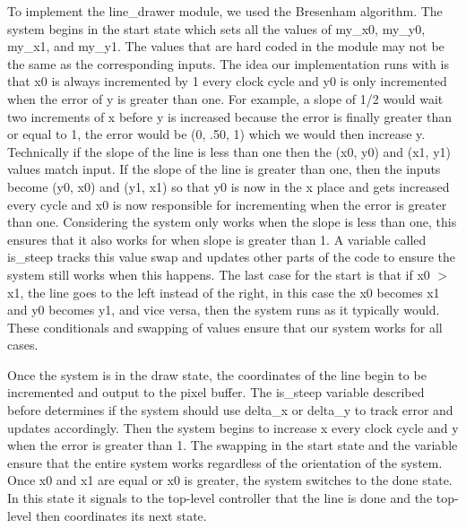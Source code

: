 \documentclass[11pt, titlepage]{article}
\begin{document}
            To implement the line\_drawer module, we used the Bresenham algorithm. The system begins in the start state which sets all the values of my\_x0, my\_y0, my\_x1, and my\_y1. The values that are hard coded in the module may not be the same as the corresponding inputs. The idea our implementation runs with is that x0 is always incremented by 1 every clock cycle and y0 is only incremented when the error of y is greater than one. For example, a slope of 1/2 would wait two increments of x before y is increased because the error is finally greater than or equal to 1, the error would be (0, .50, 1) which we would then increase y. Technically if the slope of the line is less than one then the (x0, y0) and (x1, y1) values match input. If the slope of the line is greater than one, then the inputs become (y0, x0) and (y1, x1) so that y0 is now in the x place and gets increased every cycle and x0 is now responsible for incrementing when the error is greater than one. Considering the system only works when the slope is less than one, this ensures that it also works for when slope is greater than 1. A variable called is\_steep tracks this value swap and updates other parts of the code to ensure the system still works when this happens. The last case for the start is that if x0 $>$ x1, the line goes to the left instead of the right, in this case the x0 becomes x1 and y0 becomes y1, and vice versa, then the system runs as it typically would. These conditionals and swapping of values ensure that our system works for all cases. 
            
            Once the system is in the draw state, the coordinates of the line begin to be incremented and output to the pixel buffer. The is\_steep variable described before determines if the system should use delta\_x or delta\_y to track error and updates accordingly. Then the system begins to increase x every clock cycle and y when the error is greater than 1. The swapping in the start state and the variable ensure that the entire system works regardless of the orientation of the system. Once x0 and x1 are equal or x0 is greater, the system switches to the done state. In this state it signals to the top-level controller that the line is done and the top-level then coordinates its next state.
        
        \newpage
\end{document}
